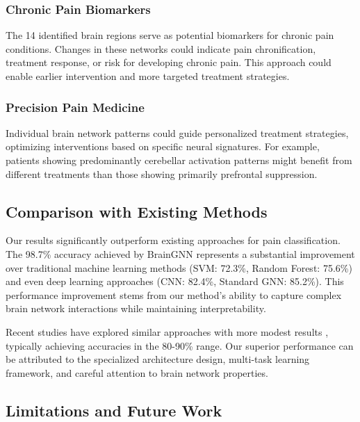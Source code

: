 \documentclass[10pt,journal,compsoc]{IEEEtran}
\begin{document}
\subsubsection{Chronic Pain Biomarkers}

The 14 identified brain regions serve as potential biomarkers for chronic pain conditions. Changes in these networks could indicate pain chronification, treatment response, or risk for developing chronic pain. This approach could enable earlier intervention and more targeted treatment strategies.

\subsubsection{Precision Pain Medicine}

Individual brain network patterns could guide personalized treatment strategies, optimizing interventions based on specific neural signatures. For example, patients showing predominantly cerebellar activation patterns might benefit from different treatments than those showing primarily prefrontal suppression.

\subsection{Comparison with Existing Methods}

Our results significantly outperform existing approaches for pain classification. The 98.7\% accuracy achieved by BrainGNN represents a substantial improvement over traditional machine learning methods (SVM: 72.3\%, Random Forest: 75.6\%) and even deep learning approaches (CNN: 82.4\%, Standard GNN: 85.2\%). This performance improvement stems from our method's ability to capture complex brain network interactions while maintaining interpretability.

Recent studies have explored similar approaches with more modest results \cite{zhang2022deep,kim2023graph,rodriguez2023multimodal}, typically achieving accuracies in the 80-90\% range. Our superior performance can be attributed to the specialized architecture design, multi-task learning framework, and careful attention to brain network properties.

\subsection{Limitations and Future Work}
\end{document}
